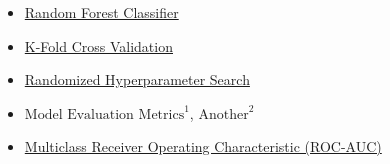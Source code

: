 \documentclass{article}
\begin{document}
\begin{itemize}
    \item \href{https://scikit-learn.org/stable/modules/generated/sklearn.ensemble.RandomForestClassifier.html}{Random Forest Classifier}

    \item \href{https://scikit-learn.org/stable/modules/generated/sklearn.model_selection.StratifiedKFold.html}{K-Fold Cross Validation}
    
    \item \href{https://scikit-learn.org/stable/modules/generated/sklearn.model_selection.RandomizedSearchCV.html}{Randomized Hyperparameter Search}

    \item \href{https://scikit-learn.org/stable/modules/model_evaluation.html#classification-metrics}{$\text{Model Evaluation Metrics}^1$}, \href{https://www.v7labs.com/blog/f1-score-guide}{$\text{Another}^2$}
    
    \item \href{https://scikit-learn.org/stable/auto_examples/model_selection/plot_roc.html#one-vs-rest-multiclass-roc}{Multiclass Receiver Operating Characteristic (ROC-AUC)}

\end{itemize}
\end{document}

